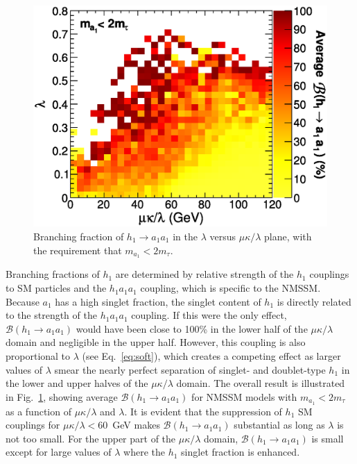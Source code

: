 \documentclass[aps,prl,twocolumn,nofootinbib,superscriptaddress]{revtex4}
\begin{document}
\begin{figure}[htb]
\includegraphics[width=0.95\linewidth]{brhaa_vs_lambda_vs_mkoverl}
\caption{Branching fraction of $h_1 \to a_1a_1$ in the $\lambda$
  versus $\mu\kappa/\lambda$ plane, with the requirement that $m_{a_1}
  < 2m_\tau$. \label{fig:brhaa}}
\end{figure}

Branching fractions of $h_1$ are determined by relative strength of
the $h_1$ couplings to SM particles and the $h_1 a_1 a_1$ coupling,
which is specific to the NMSSM.  Because $a_1$ has a high singlet
fraction, the singlet content of $h_1$ is directly related to the
strength of the $h_1 a_1 a_1$ coupling. If this were the only effect,
$\mathcal{B}(h_1 \to a_1 a_1)$ would have been close to 100\% in the
lower half of the $\mu\kappa/\lambda$ domain and negligible in the
upper half.  However, this coupling is also proportional to $\lambda$
(see Eq.~\ref{eq:soft}), which creates a competing effect as larger
values of $\lambda$ smear the nearly perfect separation of singlet-
and doublet-type $h_1$ in the lower and upper halves of the
$\mu\kappa/\lambda$ domain.  The overall result is illustrated in
Fig.~\ref{fig:brhaa}, showing average $\mathcal{B}(h_1 \to a_1 a_1)$
for NMSSM models with $m_{a_1} < 2m_\tau$ as a function of
$\mu\kappa/\lambda$ and $\lambda$.  It is evident that the suppression
of $h_1$ SM couplings for $\mu\kappa/\lambda < 60$~GeV makes
$\mathcal{B}(h_1 \to a_1 a_1)$ substantial as long as $\lambda$ is not
too small.  For the upper part of the $\mu\kappa/\lambda$ domain,
$\mathcal{B}(h_1 \to a_1 a_1)$ is small except for large values of
$\lambda$ where the $h_1$ singlet fraction is enhanced.
\end{document}
